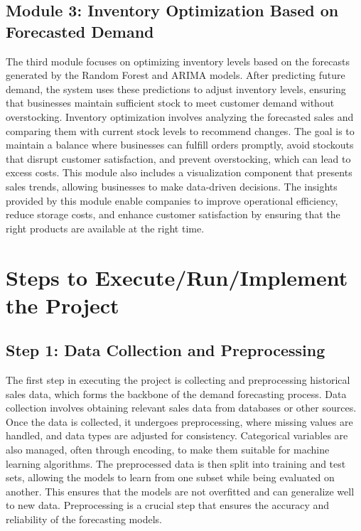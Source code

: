 \documentclass[10pt]{report}
\begin{document}
\begin{center}
\subsection{Module 3: Inventory Optimization Based on Forecasted Demand}
The third module focuses on optimizing inventory levels based on the forecasts generated by the Random Forest and ARIMA models. After predicting future demand, the system uses these predictions to adjust inventory levels, ensuring that businesses maintain sufficient stock to meet customer demand without overstocking. Inventory optimization involves analyzing the forecasted sales and comparing them with current stock levels to recommend changes. The goal is to maintain a balance where businesses can fulfill orders promptly, avoid stockouts that disrupt customer satisfaction, and prevent overstocking, which can lead to excess costs. This module also includes a visualization component that presents sales trends, allowing businesses to make data-driven decisions. The insights provided by this module enable companies to improve operational efficiency, reduce storage costs, and enhance customer satisfaction by ensuring that the right products are available at the right time.

\section{Steps to Execute/Run/Implement the Project}

\subsection{Step 1: Data Collection and Preprocessing}
The first step in executing the project is collecting and preprocessing historical sales data, which forms the backbone of the demand forecasting process. Data collection involves obtaining relevant sales data from databases or other sources. Once the data is collected, it undergoes preprocessing, where missing values are handled, and data types are adjusted for consistency. Categorical variables are also managed, often through encoding, to make them suitable for machine learning algorithms. The preprocessed data is then split into training and test sets, allowing the models to learn from one subset while being evaluated on another. This ensures that the models are not overfitted and can generalize well to new data. Preprocessing is a crucial step that ensures the accuracy and reliability of the forecasting models.


\end{center}
\end{document}
